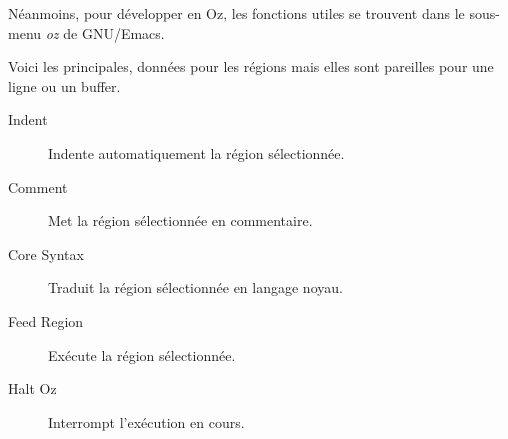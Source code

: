 Néanmoins, pour développer en Oz, les fonctions utiles se trouvent
dans le sous-menu \emph{oz} de GNU/Emacs.

Voici les principales, données pour les régions mais elles sont pareilles
pour une ligne ou un buffer.
\begin{description}
  \item[Indent] Indente automatiquement la région sélectionnée.
  \item[Comment] Met la région sélectionnée en commentaire.
  \item[Core Syntax] Traduit la région sélectionnée en langage noyau.
  \item[Feed Region] Exécute la région sélectionnée.
  \item[Halt Oz] Interrompt l'exécution en cours.
\end{description}


